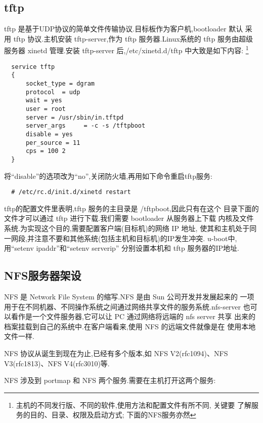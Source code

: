 \subsection{tftp}
    tftp 是基于UDP协议的简单文件传输协议.目标板作为客户机,bootloader 默认
采用 tftp 协议.主机安装 tftp-server,作为 tftp 服务器.Linux系统的 tftp
服务由超级服务器 xinetd 管理.安装 tftp-server 后,/etc/xinetd.d/tftp
中大致是如下内容:
\footnote{主机的不同发行版、不同的软件,使用方法和配置文件有所不同, 关键要
了解服务的目的、目录、权限及启动方式; 下面的NFS服务亦然}

\begin{verbatim}
  service tftp
  { 
      socket_type = dgram
      protocol  = udp
      wait = yes
      user = root
      server = /usr/sbin/in.tftpd
      server_args     = -c -s /tftpboot
      disable = yes
      per_source = 11
      cps = 100 2
  }
\end{verbatim}

    将``disable''的选项改为``no'',关闭防火墙,再用如下命令重启tftp服务:

\begin{boxedminipage}{.9\textwidth}
\begin{verbatim}
  # /etc/rc.d/init.d/xinetd restart
\end{verbatim}
\end{boxedminipage}

	tftp的配置文件里表明,tftp 服务的主目录是 /tftpboot,因此只有在这个
目录下面的文件才可以通过 tftp 进行下载.我们需要 bootloader 从服务器上下载
内核及文件系统.为实现这个目的,需要配置客户端(目标机)的网络 IP 地址,
使其和主机处于同一网段,并注意不要和其他系统(包括主机和目标机)的IP发生冲突.
u-boot中, 用``setenv ipaddr''和``setenv serverip'' 分别设置本机和 tftp
服务器的IP地址.

\subsection{NFS服务器架设}
      NFS 是 Network File System 的缩写.NFS 是由 Sun 公司开发并发展起来的
一项用于在不同机器、不同操作系统之间通过网络共享文件的服务系统.nfs-server
也可以看作是一个文件服务器,它可以让 PC 通过网络将远端的 nfs server 共享
出来的档案挂载到自己的系统中.在客户端看来,使用 NFS 的远端文件就像是在
使用本地文件一样.

    NFS 协议从诞生到现在为止,已经有多个版本,如 NFS V2(rfc1094)、NFS
V3(rfc1813)、NFS V4(rfc3010)等.

    NFS 涉及到 portmap 和 NFS 两个服务.需要在主机打开这两个服务:


